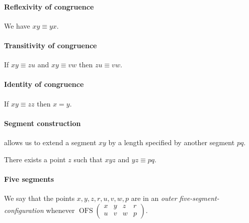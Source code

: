 \documentclass{article}
\newcommand{\Cong}[4]{#1 #2 \equiv #3 #4}
\newcommand{\Betw}[3]{#1 #2 #3}
\newcommand{\OFS}[8]{\operatorname{OFS}
\left(\begin{smallmatrix}%
#1 & #2 & #3 & #4 \\
#5 & #6 & #7 & #8
\end{smallmatrix}\right)%
}
\begin{document}
  \paragraph{Reflexivity of congruence}

  \begin{forthel}
    \begin{axiom}[A1]
      We have $\Cong{x}{y}{y}{x}$.
    \end{axiom}
  \end{forthel}


  \paragraph{Transitivity of congruence}

  \begin{forthel}
    \begin{axiom}[A2]
      If $\Cong{x}{y}{z}{u}$ and $\Cong{x}{y}{v}{w}$ then $\Cong{z}{u}{v}{w}$.
    \end{axiom}
  \end{forthel}


  \paragraph{Identity of congruence}

  \begin{forthel}
    \begin{axiom}[A3]
      If $\Cong{x}{y}{z}{z}$ then $x = y$.
    \end{axiom}
  \end{forthel}


  \paragraph{Segment construction} allows us to extend a segment $xy$
  by a length specified by another segment $pq$.

  \begin{forthel}
    \begin{axiom}[A4]
      There exists a point $z$ such that $\Betw{x}{y}{z}$ and $\Cong{y}{z}{p}{q}$.
    \end{axiom}
  \end{forthel}


  \paragraph{Five segments}
  We say that the points $x,y,z,r,u,v,w,p$ are in an \textit{outer five-segment-configuration}
  whenever $\OFS{x}{y}{z}{r}{u}{v}{w}{p}$.
\end{document}
